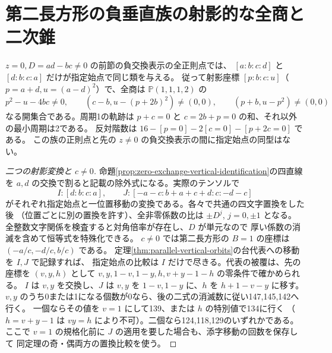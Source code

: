 \section{第二長方形の負垂直族の射影的な全商と二次錐}
\label{sec:zero-exchange-projective-quotient}
\begin{theorem}\label{thm:zero-exchange-projective-quotient}
$z=0,D=ad-bc\ne0$ の前節の負交換表示の全正則点では、
$[a:b:c:d]$ と $[d:b:c:a]$ だけが指定始点で同じ類を与える。
従って射影座標 $[p:b:c:u]$（$p=a+d,u=(a-d)^2$）で、全商は
$\mathbb P(1,1,1,2)$ の
\[
 p^2-u-4bc\ne0,\qquad (c-b,u-(p+2b)^2)\ne(0,0),\qquad
 (p+b,u-p^2)\ne(0,0)
\]
なる開集合である。周期1の軌跡は $p+c=0$ と $c=2b+p=0$ の和、それ以外の最小周期は2である。
反対階数は $16-[p=0]-2[c=0]-[p+2c=0]$ である。
この族の正則点と先の $z\ne0$ の負交換表示の間に指定始点の同型はない。
\end{theorem}
\begin{proof}[二つの射影変換と $c\ne0$]
命題\ref{prop:zero-exchange-vertical-identification}の四直線を
$a,d$ の交換で割ると記載の除外式になる。実際のテンソルで
\[
 I:[d:b:c:a],\qquad J:[-a-c:b+a+c+d:c:-d-c]
\]
がそれぞれ指定始点と一位置移動の変換である。各々で共通の四文字置換をした後
（位置ごとに別の置換を許す）、全非零係数の比は $\pm D^j$, $j=0,\pm1$ となる。
全整数文字関係を検査すると対角倍率が存在し、$D$ が単元なので
厚い係数の消滅を含めて恒等式を特殊化できる。
$c\ne0$ では第二長方形の $B=1$ の座標は $(-a/c,-d/c,b/c)$ である。
定理\ref{thm:parallel-vertical-orbits}の台代表への移動を $I,J$ で記録すれば、
指定始点の比較は $I$ だけで尽きる。代表の被覆は、先の座標を $(v,y,h)$ として
$v,y,1-v,1-y,h,v+y-1-h$ の零条件で確かめられる。
$I$ は $v,y$ を交換し、$J$ は $v,y$ を $1-v,1-y$ に、$h$ を $h+1-v-y$ に移す。
$v,y$ のうち0または1になる個数が0なら、後の二式の消滅数に従い147,145,142へ行く。
一個ならその値を $v=1$ にして139、または $h$ の特別値で134に行く
（$h=v+y-1$ は $vy=h$ により不可）。二個なら124,118,129のいずれかである。
ここで $v=1$ の規格化前に $J$ の適用を要した場合も、添字移動の回数を保存して
同定理の奇・偶両方の置換比較を使う。
\end{proof}

